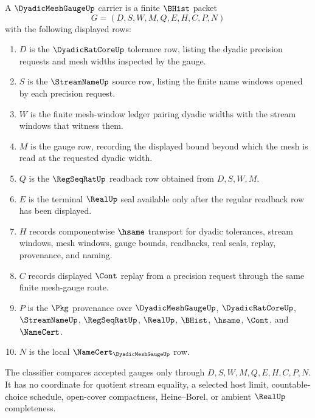 \begin{definition}
\label{def:dyadic-mesh-gauge-carrier}
A $\DyadicMeshGaugeUp$ carrier is a finite $\BHist$ packet
$$
G=(D,S,W,M,Q,E,H,C,P,N)
$$
with the following displayed rows:
\begin{enumerate}
\item $D$ is the $\DyadicRatCoreUp$ tolerance row, listing the dyadic precision requests and mesh widths inspected by the gauge.
\item $S$ is the $\StreamNameUp$ source row, listing the finite name windows opened by each precision request.
\item $W$ is the finite mesh-window ledger pairing dyadic widths with the stream windows that witness them.
\item $M$ is the gauge row, recording the displayed bound beyond which the mesh is read at the requested dyadic width.
\item $Q$ is the $\RegSeqRatUp$ readback row obtained from $D,S,W,M$.
\item $E$ is the terminal $\RealUp$ seal available only after the regular readback row has been displayed.
\item $H$ records componentwise $\hsame$ transport for dyadic tolerances, stream windows, mesh windows, gauge bounds, readbacks, real seals, replay, provenance, and naming.
\item $C$ records displayed $\Cont$ replay from a precision request through the same finite mesh-gauge route.
\item $P$ is the $\Pkg$ provenance over $\DyadicMeshGaugeUp$, $\DyadicRatCoreUp$, $\StreamNameUp$, $\RegSeqRatUp$, $\RealUp$, $\BHist$, $\hsame$, $\Cont$, and $\NameCert$.
\item $N$ is the local $\NameCert_{\DyadicMeshGaugeUp}$ row.
\end{enumerate}
The classifier compares accepted gauges only through $D,S,W,M,Q,E,H,C,P,N$. It has no coordinate for quotient stream equality, a selected host limit, countable-choice schedule, open-cover compactness, Heine--Borel, or ambient $\RealUp$ completeness.
\end{definition}

